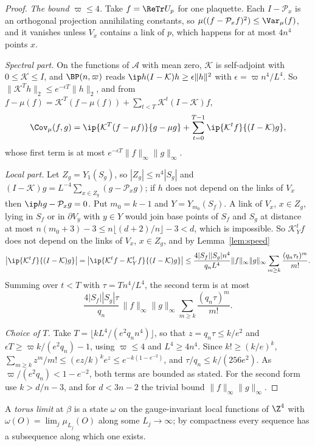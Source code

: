 \begin{proof}
\emph{The bound $\varpi\le4$.} Take $f=\ReTr U_p$ for one plaquette. Each
$I-\mathcal P_x$ is an orthogonal projection annihilating constants, so
$\mu((f-\mathcal P_xf)^2)\le\Var_\mu(f)$, and it vanishes unless $V_x$ contains
a link of $p$, which happens for at most $4n^4$ points $x$.

\emph{Spectral part.} On the functions of $\mathcal A$ with mean zero, $\mathcal K$
is self-adjoint with $0\le\mathcal K\le I$, and $\BP(n,\varpi)$ reads
$\ip h{(I-\mathcal K)h}\ge\epsilon\|h\|^2$ with $\epsilon=\varpi n^4/L^4$. So
$\|\mathcal K^Th\|_2\le e^{-\epsilon T}\|h\|_2$, and from
$f-\mu(f)=\mathcal K^T(f-\mu(f))+\sum_{t<T}\mathcal K^t(I-\mathcal K)f$,
\[
\Cov_\mu(f,g)=\ip{\mathcal K^T(f-\mu f)}{g-\mu g}+\sum_{t=0}^{T-1}
\ip{\mathcal K^tf}{(I-\mathcal K)g},
\]
whose first term is at most $e^{-\epsilon T}\|f\|_\infty\|g\|_\infty$.

\emph{Local part.} Let $Z_g=Y_1(S_g)$, so $|Z_g|\le n^4|S_g|$ and $(I-\mathcal K)g=
L^{-4}\sum_{x\in Z_g}(g-\mathcal P_xg)$; if $h$ does not depend on the links of
$V_x$ then $\ip h{g-\mathcal P_xg}=0$. Put $m_0=k-1$ and $Y=Y_{m_0}(S_f)$. A link
of $V_x$, $x\in Z_g$, lying in $S_f$ or in $\partial V_y$ with $y\in Y$ would join
base points of $S_f$ and $S_g$ at distance at most $n(m_0+3)-3\le n\lfloor
(d+2)/n\rfloor-3<d$, which is impossible. So $\mathcal K_Y^tf$ does not depend on
the links of $V_x$, $x\in Z_g$, and by Lemma~\ref{lem:speed}
\[
\bigl|\ip{\mathcal K^tf}{(I-\mathcal K)g}\bigr|=\bigl|\ip{\mathcal K^tf-\mathcal K_Y^tf}
{(I-\mathcal K)g}\bigr|\le\frac{4|S_f||S_g|n^4}{q_nL^4}\|f\|_\infty\|g\|_\infty
\sum_{m\ge k}\frac{(q_n\tau_t)^m}{m!}.
\]
Summing over $t<T$ with $\tau=Tn^4/L^4$, the second term is at most
\[
\frac{4|S_f||S_g|\tau}{q_n}\,\|f\|_\infty\|g\|_\infty\sum_{m\ge k}
\frac{(q_n\tau)^m}{m!}.
\]

\emph{Choice of $T$.} Take $T=\lfloor kL^4/(e^2q_nn^4)\rfloor$, so that $z=q_n
\tau\le k/e^2$ and $\epsilon T\ge\varpi k/(e^2q_n)-1$, using $\varpi\le4$ and
$L^4\ge4n^4$. Since $k!\ge(k/e)^k$, $\sum_{m\ge k}z^m/m!\le(ez/k)^ke^z\le
e^{-k(1-e^{-2})}$, and $\tau/q_n\le k/(256e^2)$. As $\varpi/(e^2q_n)<1-e^{-2}$,
both terms are bounded as stated. For the second form use $k>d/n-3$, and for
$d<3n-2$ the trivial bound $\|f\|_\infty\|g\|_\infty$.
\end{proof}

A \emph{torus limit} at $\beta$ is a state $\omega$ on the gauge-invariant local
functions of $\Z^4$ with $\omega(O)=\lim_j\mu_{L_j}(O)$ along some $L_j\to\infty$;
by compactness every sequence has a subsequence along which one exists.

